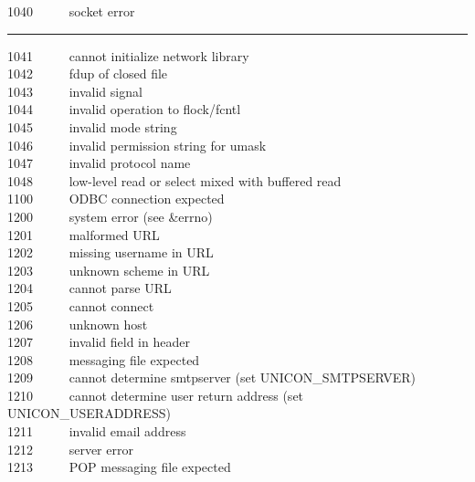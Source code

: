1040 \ \ \ \ \ socket error\\

\bigskip\hrule\vspace{0.1cm}

1041 \ \ \ \ \ cannot initialize network library\\
1042 \ \ \ \ \ fdup of closed file\\
1043 \ \ \ \ \ invalid signal\\
1044 \ \ \ \ \ invalid operation to flock/fcntl\\
1045 \ \ \ \ \ invalid mode string\\
1046 \ \ \ \ \ invalid permission string for umask\\
1047 \ \ \ \ \ invalid protocol name\\
1048 \ \ \ \ \ low-level read or select mixed with buffered read\\
1100 \ \ \ \ \ ODBC connection expected\\
1200 \ \ \ \ \ system error (see \&errno)\\
1201 \ \ \ \ \ malformed URL\\
1202 \ \ \ \ \ missing username in URL\\
1203 \ \ \ \ \ unknown scheme in URL\\
1204 \ \ \ \ \ cannot parse URL\\
1205 \ \ \ \ \ cannot connect\\
1206 \ \ \ \ \ unknown host\\
1207 \ \ \ \ \ invalid field in header\\
1208 \ \ \ \ \ messaging file expected\\
1209 \ \ \ \ \ cannot determine smtpserver
(set UNICON\_SMTPSERVER)\\
1210 \ \ \ \ \ cannot determine user return address
(set UNICON\_USERADDRESS)\\
1211 \ \ \ \ \ invalid email address\\
1212 \ \ \ \ \ server error\\
1213 \ \ \ \ \ POP messaging file expected\\

\newpage
